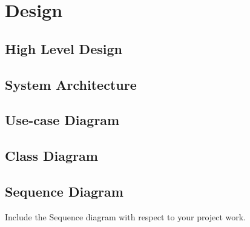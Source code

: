 \chapter{Design}
\section{High Level Design}
\section{System Architecture}
\section{Use-case Diagram}
\section{Class Diagram}
\section{Sequence Diagram}

Include the Sequence diagram with respect to your project work.
